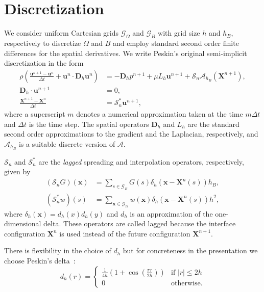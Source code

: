 \documentclass[preprint,12pt]{elsarticle}
\begin{document}
\section{Discretization}
\label{Sec:discretization}
We consider uniform Cartesian grids $\mathcal{G}_\Omega$  and $\mathcal{G}_B$ with grid size $h$ and $h_B$, respectively 
to discretize $\Omega$ and $B$  and employ standard second order finite differences for the spatial derivatives.  We write Peskin's original semi-implicit discretization in the form
\begin{align}
\rho\left(\frac{\mathbf{u}^{n+1}-\mathbf{u}^n}{\Delta t} + \mathbf{u}^n\cdot\mathbf{D}_h\mathbf{u}^n\right) &= -\mathbf{D}_h p^{n+1}+ \mu L_h \mathbf{u}^{n+1} + \mathcal{S}_n\mathcal{A}_{h_B}(\mathbf{X}^{n+1}), \label{eq:dmoment} \\
\mathbf{D}_h \cdot \mathbf{u}^{n+1} &= 0, \label{eq:ddivergence} \\
\frac{\mathbf{X}^{n+1}-\mathbf{X}^n}{\Delta t} &= \mathcal{S}^*_n\mathbf{u}^{n+1}, \label{eq:Xt}
\end{align}
where a superscript  $m$ denotes a numerical approximation taken at the time $m \Delta t$ and $\Delta t$ is the time step. The spatial operators $\mathbf{D}_h$ and $L_h$ are the standard second order approximations to the gradient and the Laplacian, respectively,  and $\mathcal{A}_{h_B}$ is a suitable discrete version of $\mathcal{A}$. 

  $ \mathcal{S}_n$ and $ \mathcal{S}^*_n$ are the  {\em lagged} spreading and interpolation operators, respectively,  given by
\begin{align}
(\mathcal{S}_n G) (\mathbf{x})&= \sum_{s \in \mathcal{G}_B }G(s) \delta_h(\mathbf{x}-\mathbf{X}^n(s))h_B,
\label{eq:S} \\
(\mathcal{S}^*_n w)(s) &= \sum_{ \mathbf{x} \in \mathcal{G}_\Omega} w(\mathbf{x})\delta_h(\mathbf{x}-\mathbf{X}^n(s))h^2,
\label{eq:S*}
\end{align}
where $\delta_h(\mathbf{x}) = d_h(x)d_h(y)$ and $d_h$ is an approximation of the one-dimensional delta. 
These operators are called lagged because the interface configuration $\mathbf{X}^n$ is used 
instead of the future configuration $\mathbf{X}^{n+1}$.

There is flexibility in the choice of $d_h$ but for concreteness in the presentation we choose Peskin's 
delta~\cite{Peskin77}:
\begin{equation}
d_h(r) = \begin{cases}
\frac{1}{4h}\left( 1+\cos(\frac{\pi r}{2h})\right)& \textrm{if } |r|\leq 2h \\
0& \textrm{otherwise}.
\end{cases}
\end{equation}
\end{document}
